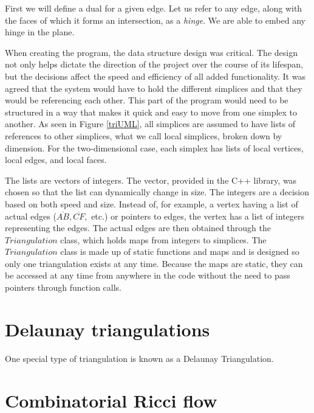 \documentclass[12pt]{article}
\begin{document}
First we will define a dual for a given edge. Let us refer to any edge, along with the faces of which it forms an intersection, as a \textit{hinge}. We are able to embed any hinge in the plane. 

When creating the program, the data structure design was critical. The design not only helps dictate the direction of the project over the course of its lifespan, but the decisions affect the speed and efficiency of all added functionality. It was agreed that the system would have to hold the different simplices and that they would be referencing each other. This part of the program would need to be structured in a way that makes it quick and easy to move from one simplex to another. As seen in Figure \ref{triUML}, all simplices are assumed to have lists of references to other simplices, what we call local simplices, broken down by dimension. For the two-dimensional case, each simplex has lists of local vertices, local edges, and local faces.\newline

\noindent The lists are vectors of integers. The vector, provided in the C++ library, was chosen so that the list can dynamically change in size. The integers are a decision based on both speed and size. Instead of, for example, a vertex having a list of actual edges ($\overline{AB}, \overline{CF},$ etc.) or pointers to edges, the vertex has a list of integers representing the edges. The actual edges are then obtained through the $Triangulation$ class, which holds maps from integers to simplices. The $Triangulation$ class is made up of static functions and maps and is designed so only one triangulation exists at any time. Because the maps are static, they can be accessed at any time from anywhere in the code without the need to pass pointers through function calls. \newline


\section{Delaunay triangulations}
\label{DT}

\noindent One special type of triangulation is known as a Delaunay Triangulation.

\section{Combinatorial Ricci flow}
\label{RBk}
\end{document}
